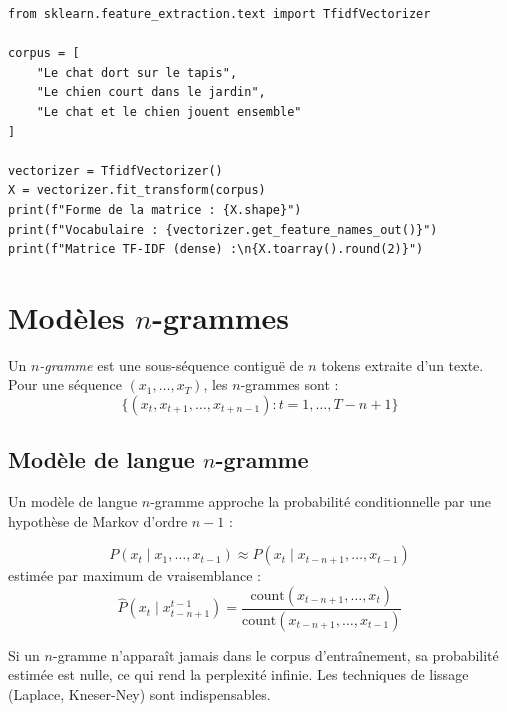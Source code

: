 \begin{codeblock}[title=\textbf{TF-IDF avec scikit-learn}]
\begin{verbatim}
from sklearn.feature_extraction.text import TfidfVectorizer

corpus = [
    "Le chat dort sur le tapis",
    "Le chien court dans le jardin",
    "Le chat et le chien jouent ensemble"
]

vectorizer = TfidfVectorizer()
X = vectorizer.fit_transform(corpus)
print(f"Forme de la matrice : {X.shape}")
print(f"Vocabulaire : {vectorizer.get_feature_names_out()}")
print(f"Matrice TF-IDF (dense) :\n{X.toarray().round(2)}")
\end{verbatim}
\end{codeblock}

\section{Mod\`eles $n$-grammes}
\label{sec:rep:ngrams}

\begin{definition}[$n$-gramme]
Un \emph{$n$-gramme} est une sous-s\'equence contigu\"e de $n$ tokens extraite
d'un texte. Pour une s\'equence $(x_1, \ldots, x_T)$, les $n$-grammes sont :
\[
\{(x_t, x_{t+1}, \ldots, x_{t+n-1}) : t = 1, \ldots, T - n + 1\}
\]
\end{definition}

\subsection{Mod\`ele de langue $n$-gramme}

Un mod\`ele de langue $n$-gramme approche la probabilit\'e conditionnelle par
une hypoth\`ese de Markov d'ordre $n-1$ :

\begin{definition}
\[
P(x_t \mid x_1, \ldots, x_{t-1}) \approx P(x_t \mid x_{t-n+1}, \ldots, x_{t-1})
\]
estim\'ee par maximum de vraisemblance :
\[
\hat{P}(x_t \mid x_{t-n+1}^{t-1}) = \frac{\text{count}(x_{t-n+1}, \ldots, x_t)}{\text{count}(x_{t-n+1}, \ldots, x_{t-1})}
\]
\end{definition}

\begin{attention}[title=\textbf{Probl\`eme des z\'eros}]
Si un $n$-gramme n'appara\^it jamais dans le corpus d'entra\^inement, sa
probabilit\'e estim\'ee est nulle, ce qui rend la perplexit\'e infinie. Les
techniques de lissage (Laplace, Kneser-Ney) sont indispensables.
\end{attention}

